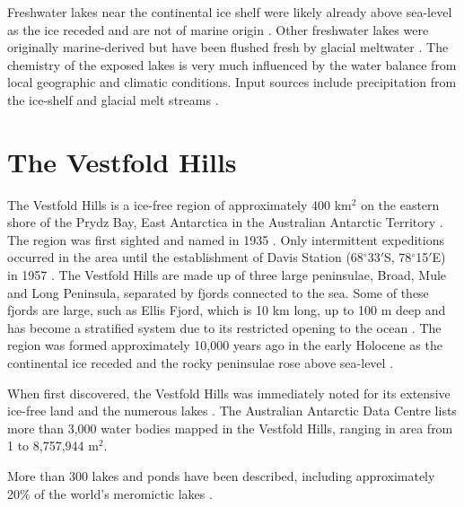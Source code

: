 Freshwater lakes near the continental ice shelf were likely already above sea-level as the ice receded and are not of marine origin \cite{Bronge1996}. %
Other freshwater lakes were originally marine-derived but have been flushed fresh by glacial meltwater \cite{Pickard1986}.
The chemistry of the exposed lakes is very much influenced by the water balance from local geographic and climatic conditions.
Input sources include precipitation from the ice-shelf and glacial melt streams \cite{Burton1981}. 


\section{The Vestfold Hills}
The Vestfold Hills  is a ice-free region of approximately 400 km$^2$ on the eastern shore of the Prydz Bay, East Antarctica in the Australian Antarctic Territory \cite{Gibson1999}.
The region was first sighted and named in 1935 \cite{Law1959}.
Only intermittent expeditions occurred in the area until the establishment of Davis Station (68$^{\circ}$33$'$S, 78$^{\circ}$15$'$E) in 1957 \cite{Law1959}. 
The Vestfold Hills are made up of three large peninsulae, Broad, Mule and Long Peninsula, separated by fjords connected to the sea.
Some of these fjords are large, such as Ellis Fjord, which is 10 km long, up to 100 m deep and has become a stratified system due to its restricted opening to the ocean \cite{Burke1988}.
The region was formed approximately 10,000 years ago in the early Holocene as the continental ice receded and the rocky peninsulae rose above sea-level \cite{Zwartz1998}. 

When first discovered, the Vestfold Hills was immediately noted for its extensive ice-free land and the numerous lakes \cite{Johnstone1973}.
The Australian Antarctic Data Centre lists more than 3,000 water bodies mapped in the Vestfold Hills, ranging in area from 1 to 8,757,944 m$^2$. %

More than 300 lakes and ponds have been described, including approximately 20\% of the world's meromictic lakes \cite{Gibson1999}. %


